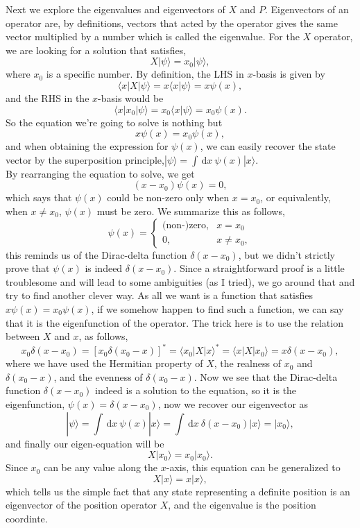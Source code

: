 \documentclass{article}
\newcommand{\be}{\begin{equation}}
\newcommand{\ee}{\end{equation}}
\newcommand{\dif}{\,\mathrm{d}}
\newcommand{\1}{\left}
\newcommand{\2}{\right}
\newcommand{\la}{\langle}
\newcommand{\ra}{\rangle}
\newcommand{\del}{\delta}
\begin{document}
Next we explore the eigenvalues and eigenvectors of $X$ and $P$. Eigenvectors of an operator are, by definitions, vectors that acted by the operator gives the same vector multiplied by a number which is called the eigenvalue. For the $X$ operator, we are looking for a solution that satisfies,
\be
X|\psi\ra=x_0|\psi\ra,
\ee
where $x_0$ is a specific number. By definition, the LHS in $x$-basis is given by
\be
\la x|X|\psi\ra=x\la x|\psi\ra=x\psi(x),
\ee
and the RHS in the $x$-basis would be
\be
\la x|x_0|\psi\ra=x_0\la x|\psi\ra=x_0\psi(x).
\ee
So the equation we're going to solve is nothing but
\be
x\psi(x)=x_0\psi(x),
\ee
and when obtaining the expression for $\psi(x)$, we can easily recover the state vector by the superposition principle,$|\psi\ra=\int\dif x\ \psi(x)|x\ra$.\\
By rearranging the equation to solve, we get
\be
(x-x_0)\psi(x)=0,
\ee
which says that $\psi(x)$ could be non-zero only when $x=x_0$, or equivalently, when $x\ne x_0$, $\psi(x)$ must be zero. We summarize this as follows,
\be
\psi(x)= \begin{cases}
\text{(non-)zero}, & x=x_0 \\
0, & x\ne x_0,
\end{cases}
\ee
this reminds us of the Dirac-delta function $\delta(x-x_0)$, but we didn't strictly prove that $\psi(x)$ is indeed $\del(x-x_0)$. Since a straightforward proof is a little troublesome and will lead to some ambiguities (as I tried), we go around that and try to find another clever way. As all we want is a function that satisfies $x\psi(x)=x_0\psi(x)$, if we somehow happen to find such a function, we can say that it is the eigenfunction of the operator. The trick here is to use the relation between $X$ and $x$, as follows,
\be
x_0\del(x-x_0)=[x_0\del(x_0-x)]^*=\la x_0|X|x\ra^*=\la x|X|x_0\ra=x\del(x-x_0),
\ee
where we have used the Hermitian property of $X$, the realness of $x_0$ and $\del(x_0-x)$, and the evenness of $\del(x_0-x)$. Now we see that the Dirac-delta function $\del(x-x_0)$ indeed is a solution to the equation, so it is the eigenfunction, $\psi(x)=\delta(x-x_0)$, now we recover our eigenvector as
\be
|\psi\ra=\int\dif x\ \psi(x)|x\ra=\int\dif x\ \del(x-x_0) |x\ra =|x_0\ra,
\ee
and finally our eigen-equation will be
\be
X|x_0\ra=x_0|x_0\ra.
\ee
Since $x_0$ can be any value along the $x$-axis, this equation can be generalized to
\be
X|x\ra=x|x\ra,
\ee
which tells us the simple fact that any state representing a definite position is an eigenvector of the position operator $X$, and the eigenvalue is the position coordinte.\\
\end{document}
